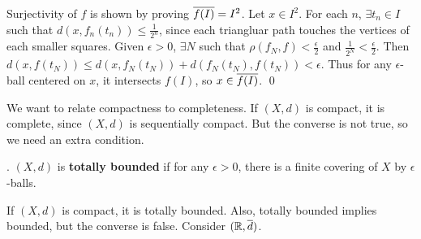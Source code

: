 Surjectivity of \(f\) is shown by proving \(\overline{f(I)} = I^2\). Let \(x \in I^2\). For each \(n\), \(\exists t_n \in I\) such that \(d(x, f_n(t_n)) \leq \frac{1}{2^n}\), since each triangluar path touches the vertices of each smaller squares. Given \(\epsilon > 0\), \(\exists N\) such that \(\rho(f_N, f) < \frac{\epsilon}{2}\) and \(\frac{1}{2^N} < \frac{\epsilon}{2}\). Then \(d(x, f(t_N)) \leq d(x, f_N(t_N)) + d(f_N(t_N), f(t_N)) < \epsilon\). Thus for any \(\epsilon\)-ball centered on \(x\), it intersects \(f(I)\), so \(x \in \overline{f(I)}\). \qed


We want to relate compactness to completeness. If \((X, d)\) is compact, it is complete, since \((X, d)\) is sequentially compact. But the converse is not true, so we need an extra condition.

.  \((X, d)\) is \textbf{totally bounded} if for any \(\epsilon > 0\), there is a finite covering of \(X\) by \(\epsilon\)-balls.

\rmk If \((X, d)\) is compact, it is totally bounded. Also, totally bounded implies bounded, but the converse is false. Consider \((\mathbb{R}, \overline{d})\).

\pagebreak
